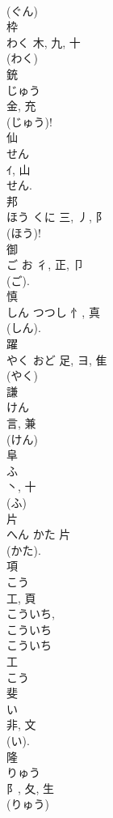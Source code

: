 \documentclass[8pt]{extreport}
\begin{document}
\begin{CJK}{UTF8}{min}
\\	(ぐん) 
\\	枠	
\\	わく	木, 九, 十	
\\	(わく) 
\\	銃	
\\	じゅう	
\\	金, 充	
\\	(じゅう)! 
\\	仙	
\\	せん	
\\	ｲ, 山	
\\	せん. 
\\	邦	
\\	ほう	くに	三, 丿, 阝	
\\	(ほう)!	
\\	御	
\\	ご	お	彳, 正, 卩		
\\	(ご). 
\\	慎	
\\	しん	つつし	忄, 真	
\\	(しん). 
\\	躍	
\\	やく	おど	足, ヨ, 隹	
\\	(やく) 
\\	謙	
\\	けん	
\\	言, 兼	
\\	(けん) 
\\	阜	
\\	ふ	
\\	丶, 十		
\\	(ふ) 
\\	片	
\\	へん	かた	片	
\\	(かた).	
\\	項	
\\	こう	
\\	工, 頁	
\\	こういち, 
\\	こういち 
\\	こういち 
\\	工 
\\	こう 
\\	斐	
\\	い	
\\	非, 文	
\\	(い). 
\\	隆	
\\	りゅう	
\\	阝, 夂, 生	
\\	(りゅう) 

\end{CJK}
\end{document}
